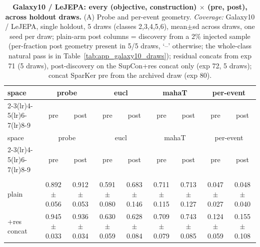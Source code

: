 \begin{landscape}
\begin{center}
\footnotesize
\setlength{\tabcolsep}{3pt}
\begin{longtable}{lcccccccc}
\caption{\textbf{Galaxy10 / LeJEPA: every (objective, construction) $\times$ (pre, post), across holdout draws.} (A) Probe and per-event geometry. \emph{Coverage:} Galaxy10 / LeJEPA, single holdout, 5 draws (classes 2,3,4,5,6), mean$\pm$sd across draws, one seed per draw; plain-arm post columns = discovery from a 2\% injected sample (per-fraction post geometry present in 5/5 draws, `--' otherwise; the whole-class natural pass is in Table~\ref{tab:app_galaxy10_draws}); residual concats from exp 71 (5 draws), post-discovery on the SupCon+res concat only (exp 72, 5 draws); concat SparKer pre from the archived draw (exp 80).}\label{tab:grid_galaxy10_lejepa_a}\\
\toprule
space & \multicolumn{2}{c}{probe} & \multicolumn{2}{c}{eucl} & \multicolumn{2}{c}{mahaT} & \multicolumn{2}{c}{per-event} \\
\cmidrule(lr){2-3}\cmidrule(lr){4-5}\cmidrule(lr){6-7}\cmidrule(lr){8-9}
& pre & post & pre & post & pre & post & pre & post \\
\midrule
\endfirsthead
\toprule
space & \multicolumn{2}{c}{probe} & \multicolumn{2}{c}{eucl} & \multicolumn{2}{c}{mahaT} & \multicolumn{2}{c}{per-event} \\
\cmidrule(lr){2-3}\cmidrule(lr){4-5}\cmidrule(lr){6-7}\cmidrule(lr){8-9}
& pre & post & pre & post & pre & post & pre & post \\
\midrule
\endhead
\bottomrule
\endfoot
\multicolumn{9}{l}{\emph{SupCon}} \\
\quad plain & 0.892$\pm$0.056 & 0.912$\pm$0.053 & 0.591$\pm$0.080 & 0.683$\pm$0.146 & 0.711$\pm$0.115 & 0.713$\pm$0.127 & 0.047$\pm$0.027 & 0.048$\pm$0.040 \\
\quad +res concat & 0.945$\pm$0.033 & 0.936$\pm$0.034 & 0.630$\pm$0.059 & 0.628$\pm$0.084 & 0.709$\pm$0.079 & 0.743$\pm$0.085 & 0.124$\pm$0.059 & 0.155$\pm$0.108 \\

\end{longtable}
\end{center}
\end{landscape}
